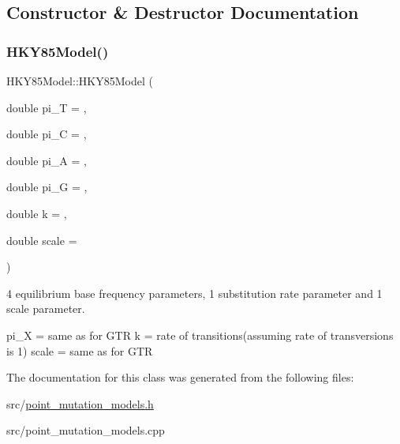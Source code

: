 \subsection{Constructor \& Destructor Documentation}
\mbox{\label{classrcombinator_1_1HKY85Model_a2f4a296cdc444c92b54a4d972b044cdb}} 
\subsubsection{\texorpdfstring{H\+K\+Y85\+Model()}{HKY85Model()}}
{\footnotesize\ttfamily H\+K\+Y85\+Model\+::\+H\+K\+Y85\+Model (\begin{DoxyParamCaption}\item[{double}]{pi\+\_\+T = {},  }\item[{double}]{pi\+\_\+C = {},  }\item[{double}]{pi\+\_\+A = {},  }\item[{double}]{pi\+\_\+G = {},  }\item[{double}]{k = {},  }\item[{double}]{scale = {} }\end{DoxyParamCaption})}



4 equilibrium base frequency parameters, 1 substitution rate parameter and 1 scale parameter. 

pi\+\_\+X = same as for G\+TR k = rate of transitions(assuming rate of transversions is 1) scale = same as for G\+TR 

The documentation for this class was generated from the following files\+:\begin{DoxyCompactItemize}
\item 
src/\mbox{\hyperlink{point__mutation__models_8h}{point\+\_\+mutation\+\_\+models.\+h}}\item 
src/point\+\_\+mutation\+\_\+models.\+cpp\end{DoxyCompactItemize}
